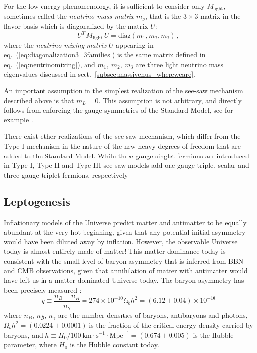 For the low-energy phenomenology, it is sufficient to consider only $M_{\text{light}}$, sometimes called the \emph{neutrino mass matrix} $m_{\nu}$, that is the $3\times3$ matrix in the flavor basis which is diagonalized by the matrix $U$:
%
\begin{equation}
U^T \, M_{\text{light}} \, U
=
\text{diag}\!\left(m_1,m_2,m_3\right)
\,,
\label{eq:diagonalization3_3families}
\end{equation}
%
\noindent where the \emph{neutrino mixing matrix} $U$ appearing in eq.~(\ref{eq:diagonalization3_3families}) is the same matrix defined in eq.~(\ref{eq:neutrinomixing}), and $m_1,\ m_2,\ m_3$ are three light neutrino mass eigenvalues discussed in sect.~\ref{subsec:massivenus_whereweare}.

An important assumption in the simplest realization of the see-saw mechanism described above is that $m_L=0$. This assumption is not arbitrary, and directly follows from enforcing the gauge symmetries of the Standard Model, see for example \cite{Giunti:2003qt}. 

There exist other realizations of the see-saw mechanism, which differ from the Type-I mechanism in the nature of the new heavy degrees of freedom that are added to the Standard Model. While three gauge-singlet fermions are introduced in Type-I, Type-II and Type-III see-saw models add one gauge-triplet scalar and three gauge-triplet fermions, respectively. 



\subsection{\label{subsec:massivenus_leptogenesis}Leptogenesis}

Inflationary models of the Universe predict matter and antimatter to be equally abundant at the very hot beginning, given that any potential initial asymmetry would have been diluted away by inflation. However, the observable Universe today is almost entirely made of matter! This matter dominance today is consistent with the small level of baryon asymmetry that is inferred from BBN and CMB observations, given that annihilation of matter with antimatter would have left us in a matter-dominated Universe today. The baryon asymmetry has been precisely measured \cite{ParticleDataGroup:2022pth,Planck:2018vyg}:
%
\begin{equation}
\eta \equiv \frac{n_B-n_{\bar{B}}}{n_{\gamma}} = 274\times 10^{-10}\Omega_bh^2 = (6.12\pm 0.04)\times 10^{-10} \label{eq:measuredbaryonasymmetry}
\end{equation}
%
where $n_B$, $n_{\bar{B}}$, $n_{\gamma}$ are the number densities of baryons, antibaryons and photons, $\Omega_bh^2=(0.0224\pm 0.0001)$ is the fraction of the critical energy density carried by baryons, and $h\equiv H_0/100\ \text{km}\cdot\text{s}^{-1}\cdot\text{Mpc}^{-1}=(0.674\pm 0.005)$ is the Hubble parameter, where $H_0$ is the Hubble constant today.

